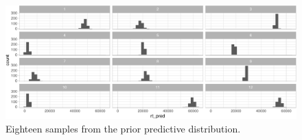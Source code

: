 \documentclass[12pt,ignorenonframetext,aspectratio=169]{beamer}
\newenvironment{Shaded}{\begin{snugshade}}{\end{snugshade}}
\newcommand{\DataTypeTok}[1]{\textcolor[rgb]{0.13,0.29,0.53}{#1}}
\newcommand{\DecValTok}[1]{\textcolor[rgb]{0.00,0.00,0.81}{#1}}
\newcommand{\KeywordTok}[1]{\textcolor[rgb]{0.13,0.29,0.53}{\textbf{#1}}}
\newcommand{\NormalTok}[1]{#1}
\newcommand{\OperatorTok}[1]{\textcolor[rgb]{0.81,0.36,0.00}{\textbf{#1}}}
\newcommand{\StringTok}[1]{\textcolor[rgb]{0.31,0.60,0.02}{#1}}
\begin{document}
\begin{frame}[fragile]

\vspace{.1in}



\scriptsize

\begin{Shaded}
\end{Shaded}

\begin{figure}
\centering
\includegraphics{03-compbayes-slides_files/figure-beamer/priorpred-simple-1.pdf}
\caption{\label{fig:priorpred-simple}Eighteen samples from the prior predictive distribution.}
\end{figure}

\normalsize

\end{frame}
\end{document}
